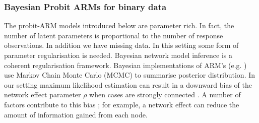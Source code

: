 \documentclass{article}
\begin{document}
\subsubsection{Bayesian Probit ARMs for binary data}
 The probit-ARM models introduced below are parameter rich. In fact, the number of latent parameters is proportional
 to the number of response observations. In addition we have missing data. In this setting some form of parameter
 regularisation is needed. Bayesian network model inference
 \cites{hepple1995bayesian2, lesage1997bayesian} is a coherent regularisation framework.
 Bayesian implementations of ARM's (e.g. \cite{lesage1999applied}) use Markov Chain Monte Carlo (MCMC)
 to summarise posterior distribution. In our setting maximum likelihood estimation can result in a downward bias of the network effect parameter $\rho$ when cases are strongly connected \cites{mizruchi2008effect, neuman2010structure}. A number of factors contribute to this bias \cite{smith2009estimation}; for example, a network effect can reduce the amount of information gained from each node.
\end{document}
